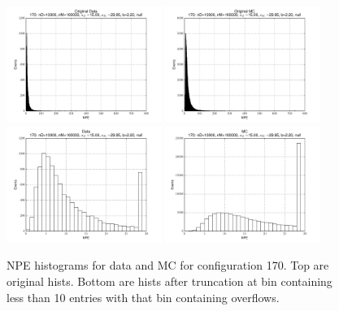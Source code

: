  \begin{figure}[htbp] \begin{center} 
\includegraphics[width=0.45\textwidth]{../FIGURES/170/FIG_Original_Data.pdf} 
\includegraphics[width=0.45\textwidth]{../FIGURES/170/FIG_Original_MC.pdf} 
\includegraphics[width=0.45\textwidth]{../FIGURES/170/FIG_Data.pdf} 
\includegraphics[width=0.45\textwidth]{../FIGURES/170/FIG_MC.pdf} 
\caption{NPE histograms for data and MC for configuration 170. Top are original hists. Bottom are hists after truncation at bin containing less than 10 entries with that bin containing overflows.} 
\label{tab:npe_170} 
\end{center} \end{figure} 
\clearpage
 